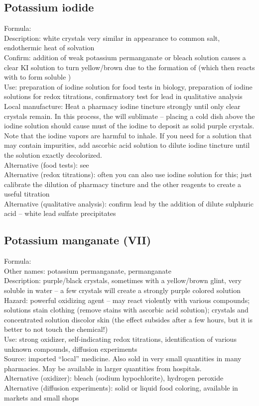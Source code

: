 \subsection*{Potassium iodide}
\label{sec:potiodide}
Formula: \\
Description: white crystals very similar in appearance to common salt, 
endothermic heat of solvation\\
Confirm: addition of weak potassium permanganate 
or bleach solution causes a clear KI solution to turn yellow/brown 
due to the formation of  (which then reacts with  to form soluble )\\
Use: preparation of iodine solution for food tests in biology, 
preparation of iodine solutions for redox titrations, 
confirmatory test for lead in qualitative analysis\\
Local manufacture: Heat a pharmacy iodine tincture strongly until 
only clear crystals remain. 
In this process, 
the  will sublimate -- 
placing a cold dish above the iodine solution should cause must of the iodine 
to deposit as solid purple crystals. 
Note that the iodine vapors are harmful to inhale.
If you need  for a solution that may contain impurities, 
add ascorbic acid solution to dilute iodine tincture 
until the solution exactly decolorized.\\
Alternative (food tests): see \\
Alternative (redox titrations): 
often you can also use iodine solution for this; 
just calibrate the dilution of pharmacy tincture 
and the other reagents to create a useful titration\\
Alternative (qualitative analysis): 
confirm lead by the addition of dilute sulphuric acid -- 
white lead sulfate precipitates
\subsection*{Potassium manganate (VII)}
Formula: \\
Other names: potassium permanganate, 
permanganate\\
Description: purple/black crystals, 
sometimes with a yellow/brown glint, 
very soluble in water -- 
a few crystals will create a strongly purple colored solution\\
Hazard: powerful oxidizing agent -- 
may react violently with various compounds; 
solutions stain clothing (remove stains with ascorbic acid solution); 
crystals and concentrated solution discolor skin 
(the effect subsides after a few hours, 
but it is better to not touch the chemical!)\\
Use: strong oxidizer, 
self-indicating redox titrations, 
identification of various unknown compounds, 
diffusion experiments\\
Source: imported ``local'' medicine. 
Also sold in very small quantities in many pharmacies. 
May be available in larger quantities from hospitals.\\
Alternative (oxidizer): bleach (sodium hypochlorite), 
hydrogen peroxide\\
Alternative (diffusion experiments): solid or liquid food coloring, 
available in markets and small shops
